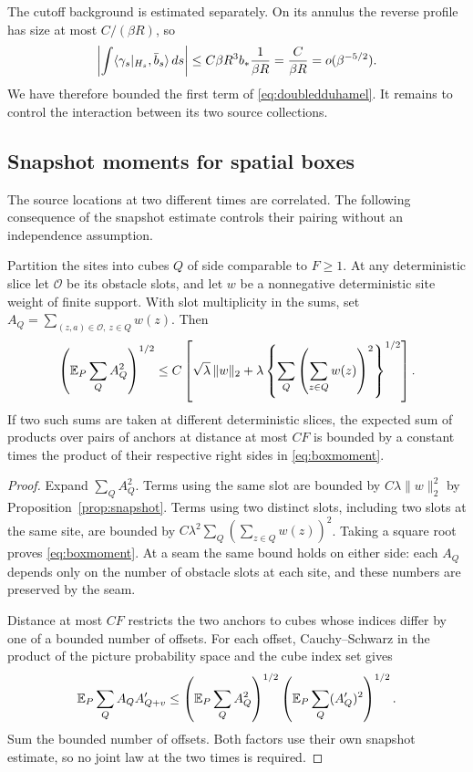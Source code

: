 The cutoff background is estimated separately.  On its annulus the
reverse profile has size at most $C/(\beta R)$, so
\begin{equation}\label{eq:scalarbackground}
 \left|\int\langle \gamma_s|_{H_s},\bar b_s\rangle\,ds\right|
 \le C\beta R^3 b_*\frac1{\beta R}
 =\frac C{\beta R}=o(\beta^{-5/2}).
\end{equation}
We have therefore bounded the first term of
\eqref{eq:doubledduhamel}.  It remains to control the interaction
between its two source collections.

\subsection{Snapshot moments for spatial boxes}

The source locations at two different times are correlated.  The
following consequence of the snapshot estimate controls their
pairing without an independence assumption.

\begin{lemma}\label{lem:boxmoment}
Partition the sites into cubes $Q$ of side comparable to $F\ge1$.
At any deterministic slice let $\mathcal O$ be its obstacle slots,
and let $w$ be a nonnegative deterministic site weight of finite
support.  With slot multiplicity in the sums, set
$A_Q=\sum_{(z,a)\in\mathcal O,\ z\in Q}w(z)$.  Then
\begin{equation}\label{eq:boxmoment}
 \left(\mathbb E_P\sum_Q A_Q^2\right)^{1/2}
 \le C\left[
  \sqrt\lambda\,\|w\|_2
  +\lambda\left\{\sum_Q
                     \left(\sum_{z\in Q}w(z)\right)^2\right\}^{1/2}
                 \right].
\end{equation}
If two such sums are taken at different deterministic slices, the
expected sum of products over pairs of anchors at distance at most
$CF$ is bounded by a constant times the product of their respective
right sides in \eqref{eq:boxmoment}.
\end{lemma}

\begin{proof}
Expand $\sum_Q A_Q^2$.  Terms using the same slot are bounded by
$C\lambda\|w\|_2^2$ by Proposition~\ref{prop:snapshot}.  Terms using
two distinct slots, including two slots at the same site, are bounded
by $C\lambda^2\sum_Q(\sum_{z\in Q}w(z))^2$.  Taking a square root
proves \eqref{eq:boxmoment}.
At a seam the same bound holds on either side: each $A_Q$ depends
only on the number of obstacle slots at each site, and these numbers
are preserved by the seam.

Distance at most $CF$ restricts the two anchors to cubes whose
indices differ by one of a bounded number of offsets.  For each
offset, Cauchy--Schwarz in the product of the picture probability
space and the cube index set gives
\[
 \mathbb E_P\sum_Q A_Q A'_{Q+v}
 \le\left(\mathbb E_P\sum_Q A_Q^2\right)^{1/2}
      \left(\mathbb E_P\sum_Q (A'_Q)^2\right)^{1/2}.
\]
Sum the bounded number of offsets.  Both factors use their own
snapshot estimate, so no joint law at the two times is required.
\end{proof}

